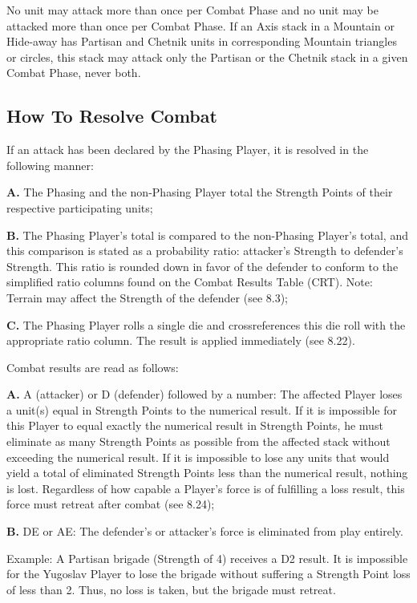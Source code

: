  No unit may attack more than once per Combat Phase and no unit may be attacked more than once per Combat Phase. If an Axis stack in a Mountain or Hide-away has Partisan and Chetnik units in corresponding Mountain triangles or circles, this stack may attack only the Partisan or the Chetnik stack in a given Combat Phase, never both.

\subsection{How To Resolve Combat}\label{sec:8.2}

 If an attack has been declared by the Phasing Player, it is resolved in the following manner:

\textbf{A.} The Phasing and the non-Phasing Player total the Strength Points of their respective participating units;

\textbf{B.} The Phasing Player’s total is compared to the non-Phasing Player’s total, and this comparison is stated as a probability ratio: attacker’s Strength to defender’s Strength. This ratio is rounded down in favor of the defender to conform to the simplified ratio columns found on the Combat Results Table (CRT). Note: Terrain may affect the Strength of the defender (see 8.3);

\textbf{C.} The Phasing Player rolls a single die and crossreferences this die roll with the appropriate ratio column. The result is applied immediately (see 8.22).

 Combat results are read as follows:

\textbf{A.} A (attacker) or D (defender) followed by a number: The affected Player loses a unit(s) equal in Strength Points to the numerical result. If it is impossible for this Player to equal exactly the numerical result in Strength Points, he must eliminate as many Strength Points as possible from the affected stack without exceeding the numerical result. If it is impossible to lose any units that would yield a total of eliminated Strength Points less than the numerical result, nothing is lost. Regardless of how capable a Player’s force is of fulfilling a loss result, this force must retreat after combat (see 8.24);

\textbf{B.} DE or AE: The defender’s or attacker’s force is eliminated from play entirely.

Example: A Partisan brigade (Strength of 4) receives a D2 result. It is impossible for the Yugoslav Player to lose the brigade without suffering a Strength Point loss of less than 2. Thus, no loss is taken, but the brigade must retreat.

